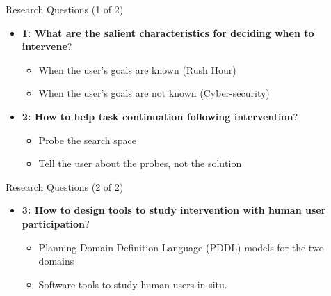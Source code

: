 \begin{frame}{Research Questions (1 of 2)}
\begin{itemize}
\item \textbf{1: What are the salient characteristics for deciding when to intervene}?
\begin{itemize}
\item When the user’s goals are known (Rush Hour)
\item When the user's goals are not known (Cyber-security)
\end{itemize}
\item \textbf{2: How to help task continuation following intervention}?
\begin{itemize}
\item Probe the search space
\item Tell the user about the probes, not the solution
\end{itemize}
\end{itemize}
\end{frame}

\begin{frame}{Research Questions (2 of 2)}
\begin{itemize}
\item \textbf{3: How to design tools to study intervention with human user participation}?
\begin{itemize}
\item Planning Domain Definition Language (PDDL) models for the two domains
\item Software tools to study human users in-situ.
\end{itemize}
\end{itemize}
\end{frame}